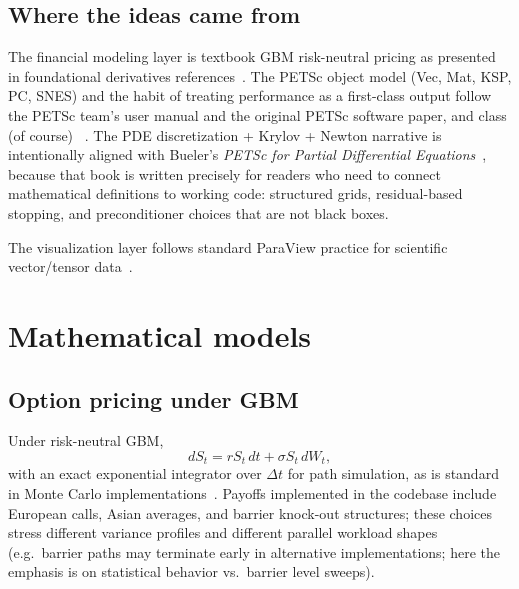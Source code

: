 \documentclass[11pt]{article}
\begin{document}
\subsection{Where the ideas came from}
The financial modeling layer is textbook GBM risk-neutral pricing as
presented in foundational derivatives references~\cite{blackscholes,merton1973}.
The PETSc object model (Vec, Mat, KSP, PC, SNES) and the habit of treating
performance as a first-class output follow the PETSc team's user manual and the
original PETSc software paper, and class (of course) ~\cite{petsc-user-ref,petsc-efficient}. The
PDE discretization + Krylov + Newton narrative is intentionally aligned with
Bueler's \emph{PETSc for Partial Differential Equations}~\cite{bueler2020petsc},
because that book is written precisely for readers who need to connect mathematical
definitions to working code: structured grids, residual-based stopping, and
preconditioner choices that are not black boxes.

The visualization layer follows standard ParaView practice for scientific
vector/tensor data~\cite{paraview-guide}.

\section{Mathematical models}
\subsection{Option pricing under GBM}
Under risk-neutral GBM,
\[
  dS_t = r S_t\,dt + \sigma S_t\,dW_t,
\]
with an exact exponential integrator over $\Delta t$ for path simulation, as is
standard in Monte Carlo implementations~\cite{blackscholes,merton1973}. Payoffs
implemented in the codebase include European calls, Asian averages, and barrier
knock-out structures; these choices stress different variance profiles and
different parallel workload shapes (e.g.\ barrier paths may terminate early in
alternative implementations; here the emphasis is on statistical behavior vs.\
barrier level sweeps).
\end{document}
